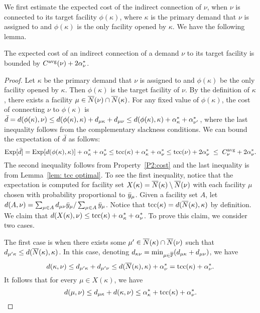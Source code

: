 \documentclass[11pt]{article}
\begin{document}
We first estimate the expected cost of the indirect
connection of $\nu$, when $\nu$ is connected to its target
facility $\phi(\kappa)$, where $\kappa$ is the primary
demand that $\nu$ is assigned to and $\phi(\kappa)$ is the
only facility opened by $\kappa$. We have the following
lemma.
\begin{lemma}
  \label{lem:echu indirect}
  The expected cost of an indirect connection of a demand
  $\nu$ to its target facility is bounded by
  $C^{{\mbox{\scriptsize\rm avg}}}(\nu)+2\alpha_{\nu}^\ast$.
\end{lemma}
\begin{proof}
  Let $\kappa$ be the primary demand that $\nu$ is assigned
  to and $\phi(\kappa)$ be the only facility opened by
  $\kappa$. Then $\phi(\kappa)$ is the target facility of
  $\nu$. By the definition of $\kappa$, there exists a
  facility $\mu\in {\overline{N}}(\nu)\cap {\overline{N}}(\kappa)$.  For any
  fixed value of $\phi(\kappa)$, the cost of connecting
  $\nu$ to $\phi(\kappa)$ is ${\bar d} = d(\phi(\kappa),\nu)
  \le d(\phi(\kappa),\kappa)+ d_{\mu\kappa}+d_{\mu\nu} \le
  d(\phi(\kappa),\kappa)+\alpha_{\kappa}^\ast +
  \alpha_{\nu'}^\ast$, where the last inequality follows
  from the complementary slackness conditions. We can bound
  the expectation of ${\bar d}$ as follows:
%
\begin{equation}
	\label{eqn: 1.76 connection cost}
  \mbox{\rm Exp}[{\bar d}] = \mbox{\rm Exp}[d(\phi(\kappa), \kappa)]  + \alpha_{\kappa}^\ast + \alpha_{\nu}^\ast
  \leq \textrm{tcc}(\kappa) + \alpha_{\kappa}^\ast + \alpha_{\nu}^\ast
  \leq \textrm{tcc}(\nu) + 2\alpha_{\nu}^\ast\;\leq\; C^{{\mbox{\scriptsize\rm avg}}}_{\nu} + 2\alpha_{\nu}^\ast.
\end{equation}
%
The second inequality follows from Property~\ref{P2:cost}
and the last inequality is from Lemma~\ref{lem: tcc optimal}.
To see the first inequality, notice that the
expectation is computed for facility set
$X(\kappa)={\overline{N}}(\kappa) \setminus {\overline{N}}(\nu)$ with each facility
$\mu$ chosen with probability proportional to
${\bar y}_{\mu}$. Given a facility set $A$, let
$d(A,\nu)=\sum_{\mu\in A} d_{\mu\nu}{\bar y}_{\mu}/\sum_{\mu\in
  A} {\bar y}_{\mu}$. Notice that
$\textrm{tcc}(\kappa)=d({\overline{N}}(\kappa),\kappa)$ by definition. We
claim that $d(X(\kappa),\nu) \leq \textrm{tcc}(\kappa) +
\alpha_{\kappa}^\ast + \alpha_{\nu}^\ast$. To prove this
claim, we consider two cases. 

 The first case is when there exists some $\mu'\in
{\overline{N}}(\kappa) \cap {\overline{N}}(\nu)$ such that $d_{\mu' \kappa}
\leq d({\overline{N}}(\kappa), \kappa)$. In this case, denoting
$d_{\kappa \nu}=\min_{\mu\in\overline{\mathbb{F}}} (d_{\mu\kappa} +
d_{\mu\nu})$, we have
\begin{equation*}
  d(\kappa,\nu)\leq
  d_{\mu'\kappa} + d_{\mu'\nu} \leq d({\overline{N}}(\kappa),\kappa) +
  \alpha_{\nu}^\ast=\textrm{tcc}(\kappa)+\alpha_{\nu}^\ast. 
\end{equation*}
It follows that for every $\mu\in X(\kappa)$, we have
\begin{equation*}
  d(\mu,\nu) \leq d_{\mu\kappa} + d(\kappa,\nu) \leq
  \alpha_{\kappa}^\ast + \textrm{tcc}(\kappa) + \alpha_{\nu}^\ast.
\end{equation*}


\end{proof}
\end{document}
